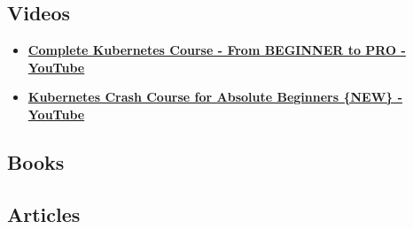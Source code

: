 \documentclass[14pt]{article}
\let\oldhref\href
\renewcommand{\href}[2]{\oldhref{#1}{\textbf{#2}}}
\begin{document}
\subsection*{Videos}
\label{sec:orgb612b0a}
\begin{itemize}
\item \href{https://www.youtube.com/watch?v=2T86xAtR6Fo}{Complete Kubernetes Course - From BEGINNER to PRO - YouTube}
\item \href{https://www.youtube.com/watch?v=s\_o8dwzRlu4}{Kubernetes Crash Course for Absolute Beginners \{NEW\} - YouTube}
\end{itemize}
\subsection*{Books}
\label{sec:org1419352}
\subsection*{Articles}
\label{sec:orge6bb85d}
\end{document}
